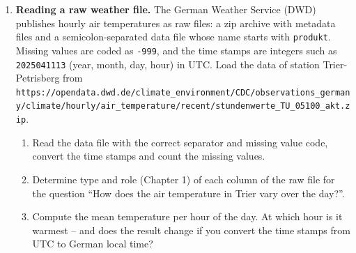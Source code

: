 \documentclass[
  letterpaper,
  DIV=11,
  numbers=noendperiod]{scrreprt}
\begin{document}
\begin{enumerate}
\def\labelenumi{\arabic{enumi}.}
\item
  \textbf{Reading a raw weather file.} The German Weather Service (DWD)
  publishes hourly air temperatures as raw files: a zip archive with
  metadata files and a semicolon-separated data file whose name starts
  with \texttt{produkt}. Missing values are coded as \texttt{-999}, and
  the time stamps are integers such as \texttt{2025041113} (year, month,
  day, hour) in UTC. Load the data of station Trier-Petrisberg from
  \texttt{https://opendata.dwd.de/climate\_environment/CDC/observations\_germany/climate/hourly/air\_temperature/recent/stundenwerte\_TU\_05100\_akt.zip}.

  \begin{enumerate}
  \def\labelenumii{(\alph{enumii})}
  \item
    Read the data file with the correct separator and missing value
    code, convert the time stamps and count the missing values.
  \item
    Determine type and role (Chapter 1) of each column of the raw file
    for the question ``How does the air temperature in Trier vary over
    the day?''.
  \item
    Compute the mean temperature per hour of the day. At which hour is
    it warmest -- and does the result change if you convert the time
    stamps from UTC to German local time?
  \end{enumerate}


\end{enumerate}
\end{document}
